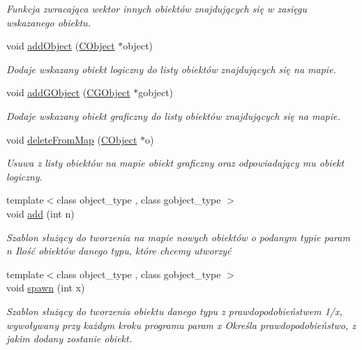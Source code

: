 \begin{DoxyCompactItemize}
\begin{DoxyCompactList}\small\item\em Funkcja zwracająca wektor innych obiektów znajdujących się w zasięgu wskazanego obiektu. \end{DoxyCompactList}\item 
void \mbox{\hyperlink{class_c_map_a4b22b964e9d16e428c0a56b15b235c82}{add\+Object}} (\mbox{\hyperlink{class_c_object}{C\+Object}} $\ast$object)
\begin{DoxyCompactList}\small\item\em Dodaje wskazany obiekt logiczny do listy obiektów znajdujących się na mapie. \end{DoxyCompactList}\item 
void \mbox{\hyperlink{class_c_map_adfb0980e5f2153cd6b287a010795c6b4}{add\+G\+Object}} (\mbox{\hyperlink{class_c_g_object}{C\+G\+Object}} $\ast$gobject)
\begin{DoxyCompactList}\small\item\em Dodaje wskazany obiekt graficzny do listy obiektów znajdujących się na mapie. \end{DoxyCompactList}\item 
void \mbox{\hyperlink{class_c_map_a55bccb7dd240a21de6e5d12df054d0cb}{delete\+From\+Map}} (\mbox{\hyperlink{class_c_object}{C\+Object}} $\ast$o)
\begin{DoxyCompactList}\small\item\em Usuwa z listy obiektów na mapie obiekt graficzny oraz odpowiadający mu obiekt logiczny. \end{DoxyCompactList}\item 
{\footnotesize template$<$class object\+\_\+type , class gobject\+\_\+type $>$ }\\void \mbox{\hyperlink{class_c_map_a448bdffc8a0a0fcbd39e1e7661b5d6ab}{add}} (int n)
\begin{DoxyCompactList}\small\item\em Szablon służący do tworzenia na mapie nowych obiektów o podanym typie param n Ilość obiektów danego typu, które chcemy utworzyć \end{DoxyCompactList}\item 
{\footnotesize template$<$class object\+\_\+type , class gobject\+\_\+type $>$ }\\void \mbox{\hyperlink{class_c_map_a194d39490529731472920eac44df1548}{spawn}} (int x)
\begin{DoxyCompactList}\small\item\em Szablon służący do tworzenia obiektu danego typu z prawdopodobieństwem 1/x, wywoływany przy każdym kroku programu param x Określa prawdopodobieństwo, z jakim dodany zostanie obiekt. \end{DoxyCompactList}\end{DoxyCompactItemize}


